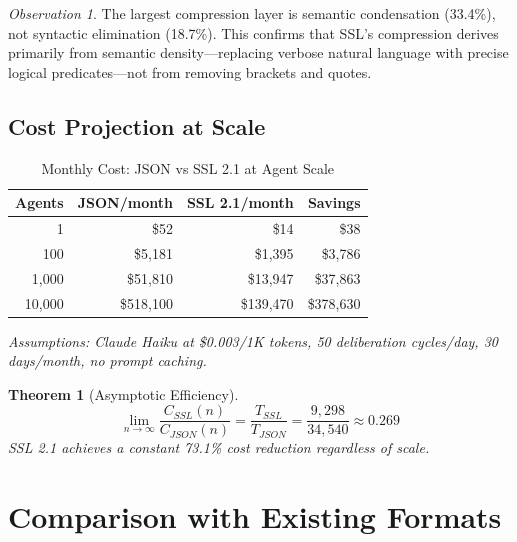 \documentclass[12pt,a4paper]{article}
\theoremstyle{plain}
\newtheorem{theorem}{Theorem}[section]
\theoremstyle{definition}
\theoremstyle{remark}
\newtheorem*{observation}{Observation}
\begin{document}
\begin{observation}
The largest compression layer is semantic condensation (33.4\%), not syntactic elimination (18.7\%). This confirms that SSL's compression derives primarily from semantic density---replacing verbose natural language with precise logical predicates---not from removing brackets and quotes.
\end{observation}

\subsection{Cost Projection at Scale}

\begin{table}[H]
\centering
\caption{Monthly Cost: JSON vs SSL 2.1 at Agent Scale}
\label{tab:cost}
\begin{tabular}{@{}rrrr@{}}
\toprule
\textbf{Agents} & \textbf{JSON/month} & \textbf{SSL 2.1/month} & \textbf{Savings} \\
\midrule
1 & \$52 & \$14 & \$38 \\
100 & \$5,181 & \$1,395 & \$3,786 \\
1,000 & \$51,810 & \$13,947 & \$37,863 \\
10,000 & \$518,100 & \$139,470 & \$378,630 \\
\bottomrule
\end{tabular}
\end{table}

\textit{Assumptions: Claude Haiku at \$0.003/1K tokens, 50 deliberation cycles/day, 30 days/month, no prompt caching.}

\begin{theorem}[Asymptotic Efficiency]
\[
\lim_{n \to \infty} \frac{C_{SSL}(n)}{C_{JSON}(n)} = \frac{T_{SSL}}{T_{JSON}} = \frac{9{,}298}{34{,}540} \approx 0.269
\]
SSL 2.1 achieves a constant 73.1\% cost reduction regardless of scale.
\end{theorem}

\section{Comparison with Existing Formats}
\end{document}
